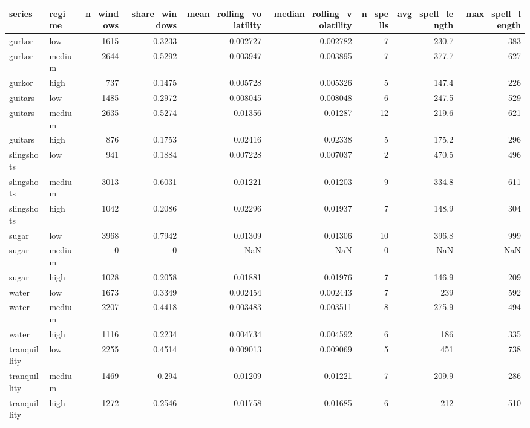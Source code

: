 \begin{tabular}{llrrrrrrr}
\toprule
series & regime & n_windows & share_windows & mean_rolling_volatility & median_rolling_volatility & n_spells & avg_spell_length & max_spell_length \\
\midrule
gurkor & low & 1615 & 0.3233 & 0.002727 & 0.002782 & 7 & 230.7 & 383 \\
gurkor & medium & 2644 & 0.5292 & 0.003947 & 0.003895 & 7 & 377.7 & 627 \\
gurkor & high & 737 & 0.1475 & 0.005728 & 0.005326 & 5 & 147.4 & 226 \\
guitars & low & 1485 & 0.2972 & 0.008045 & 0.008048 & 6 & 247.5 & 529 \\
guitars & medium & 2635 & 0.5274 & 0.01356 & 0.01287 & 12 & 219.6 & 621 \\
guitars & high & 876 & 0.1753 & 0.02416 & 0.02338 & 5 & 175.2 & 296 \\
slingshots & low & 941 & 0.1884 & 0.007228 & 0.007037 & 2 & 470.5 & 496 \\
slingshots & medium & 3013 & 0.6031 & 0.01221 & 0.01203 & 9 & 334.8 & 611 \\
slingshots & high & 1042 & 0.2086 & 0.02296 & 0.01937 & 7 & 148.9 & 304 \\
sugar & low & 3968 & 0.7942 & 0.01309 & 0.01306 & 10 & 396.8 & 999 \\
sugar & medium & 0 & 0 & NaN & NaN & 0 & NaN & NaN \\
sugar & high & 1028 & 0.2058 & 0.01881 & 0.01976 & 7 & 146.9 & 209 \\
water & low & 1673 & 0.3349 & 0.002454 & 0.002443 & 7 & 239 & 592 \\
water & medium & 2207 & 0.4418 & 0.003483 & 0.003511 & 8 & 275.9 & 494 \\
water & high & 1116 & 0.2234 & 0.004734 & 0.004592 & 6 & 186 & 335 \\
tranquillity & low & 2255 & 0.4514 & 0.009013 & 0.009069 & 5 & 451 & 738 \\
tranquillity & medium & 1469 & 0.294 & 0.01209 & 0.01221 & 7 & 209.9 & 286 \\
tranquillity & high & 1272 & 0.2546 & 0.01758 & 0.01685 & 6 & 212 & 510 \\
\bottomrule
\end{tabular}
